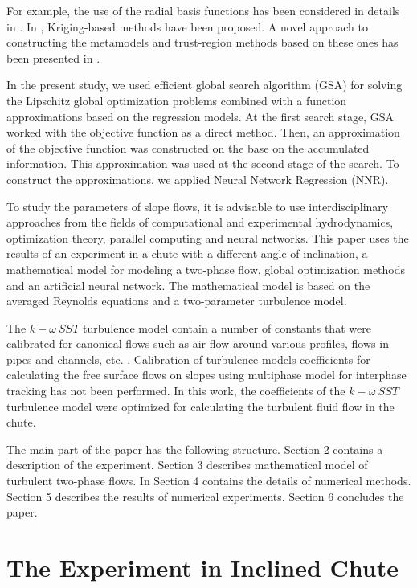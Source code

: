 \documentclass[applsci,article,submit,moreauthors,pdftex]{Definitions/mdpi}
\begin{document}
For example, the use of the radial basis functions has been considered in details in \cite{Gutmann2001,Regis2005}. In \cite{Jones1998,UrRehman2014,Ollar2017_1}, Kriging-based methods have been proposed. A novel approach to constructing the metamodels and trust-region methods based on these ones has been presented in \cite{Polynkin2012,Ollar2017_2,Toropov2018}. 

In the present study, we used efficient global search algorithm (GSA) \cite{Strongin2000,Sergeyev2013} for solving the Lipschitz global optimization problems combined with a function approximations based on the regression models. At the first search stage, GSA worked with the objective function as a direct method. Then, an approximation of the objective function was constructed on the base on the accumulated information. This approximation was used at the second stage of the search.
To construct the approximations, we applied Neural Network Regression (NNR).

To study the parameters of slope flows, it is advisable to use interdisciplinary approaches from the fields of computational and experimental hydrodynamics, optimization theory, parallel computing and neural networks. This paper uses the results of an experiment in a chute with a different angle of inclination, a mathematical model for modeling a two-phase flow, global optimization methods and an artificial neural network. The mathematical model is based on the averaged Reynolds equations and a two-parameter turbulence model. 

The $k-\omega\ SST$ turbulence model contain a number of constants that were calibrated for canonical flows such as air flow around various profiles, flows in pipes and channels, etc. \cite{LaunderSpalding1974, Tahry1983, LaunderMorseRodiSpaldiug1972}. Calibration of turbulence models coefficients for calculating the free surface flows on slopes using multiphase model for interphase tracking has not been performed. In this work, the coefficients of the $k-\omega\ SST$ turbulence model were optimized for calculating the turbulent fluid flow in the chute.

The main part of the paper has the following structure. 
Section 2 contains a description of the experiment. Section 3 describes mathematical model of turbulent two-phase flows. In Section 4 contains the details of numerical methods. 
Section 5 describes the results of numerical experiments. 
Section 6 concludes the paper.


\section{The Experiment in Inclined Chute}
\end{document}
